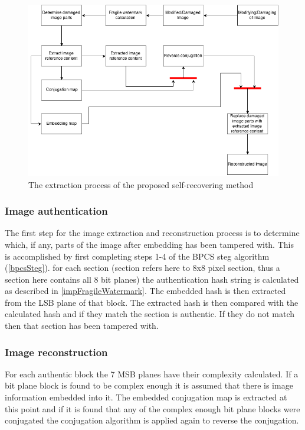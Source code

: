 \documentclass[12pt]{article}
\begin{document}
\begin{figure}[h]
\centerline{%
\includegraphics[scale=0.6]{"ExtractionProcess"}%
} %
\caption{The extraction process of the proposed self-recovering method}
\label{fig:extractionProcess}
\end{figure} 

\subsubsection{Image authentication}
\label{extractionAuthentication}
The first step for the image extraction and reconstruction process is to determine which, if any, parts of the image after embedding has been tampered with.
This is accomplished by first completing steps 1-4 of the BPCS steg algorithm (\ref{bpcsSteg}).
for each section (section refers here to 8x8 pixel section, thus a section here contains all 8 bit planes) the authentication hash string is calculated as described in \ref{impFragileWatermark}. 
The embedded hash is then extracted from the LSB plane of that block.
The extracted hash is then compared with the calculated hash and if they match the section is authentic.
If they do not match then that section has been tampered with.

\subsubsection{Image reconstruction}
\label{extractionReconstruction}
For each authentic block the 7 MSB planes have their complexity calculated.
If a bit plane block is found to be complex enough it is assumed that there is image information embedded into it.
The embedded conjugation map is extracted at this point and if it is found that any of the complex enough bit plane blocks were conjugated the conjugation algorithm is applied again to reverse the conjugation.
\end{document}
